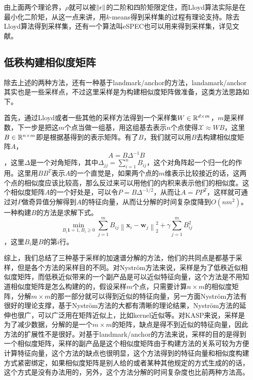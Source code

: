 由上面两个理论界，$\rho$就可以被$\left\lVert\epsilon\right\rVert$的二阶和四阶矩限定住，而Lloyd算法实际是在最小化二阶矩，从这一点来讲，用$k$-means得到采样集的过程有理论支持。除去Lloyd算法得到采样集，还有一个算法叫eSPEC也可以用来得到采样集，详见文献\cite{wang2009approximate}。

\subsection{低秩构建相似度矩阵}
除去上述的两种方法，还有一种基于landmark/anchor的方法，landamark/anchor其实也是一些采样点，不过这里采样是为构建相似度矩阵做准备，这类方法思路如下。

首先，通过Lloyd或者一些其他的采样方法得到一个采样集$W \in \mathbb{R}^{d \times m}$，$m$是采样数，下一步是把这$m$个点当做一组基，用这组基去表示$n$个点使得$\mathcal{X} \approx WB$，这里$B \in \mathbb{R}^{n \times m}$即是根据基得到的表示矩阵。有了$B$，我们就可以用$B$去构建相似度矩阵$A$，$$A = B\Delta^{-1}B$$，这里$\Delta$是一个对角矩阵，其中$\Delta_{jj} = \sum_{i=1}^n B_{ij}$，这个对角阵起一个归一化的作用。这里用$BB^T$表示$A$的一个直觉是，如果两个点的$m$维表示比较接近的话，这两个点的相似度应该比较高，那么反过来可以用他们的内积来表示他们的相似度。这个相似度矩阵$A$的一个好处是，可以令$P = B\Delta^{-1/2}$，从而让$A = PP^T$，这样就可通过对$P$做奇异值分解得到$A$的特征向量，从而让分解的时间复杂度降到$O(nm^2)$。一种构建$B$的方法是求解下式。$$\min _{B_i \mathbf{1}=1, B_i \geq 0} \sum_{j=1}^{m} B_{i j}\left\|\mathbf{x}_{i}-\mathbf{w}_{j}\right\|_{2}^{2}+\gamma \sum_{j=1}^{m} B_{i j}^{2}$$，这里$B_i$是$B$的第$i$行。

综上，我们总结了三种基于采样的加速谱分解的方法，他们的共同点是都基于采样，但是各个方法的采样目的不同。对Nyström方法来说，采样是为了低秩近似相似度矩阵，而低秩近似带来的一个副产品是可以近似特征向量，这个方法是不用知道相似度矩阵是怎么构建的的，假设采样$m$个点，只需要计算$n \times m$的相似度矩阵，分解$m \times m$的那一部分就可以得到近似的特征向量，另一方面Nyström方法有很好的理论支撑，基于Nyström方法的大都有清晰的理论结果，Nyström方法的延伸也很广，可以广泛用在矩阵近似上，比如kernel近似等。对KASP来说，采样是为了减少数据，分解的是一个$m \times m$的矩阵，缺点是得不到近似的特征向量，因此方法的扩展性不是很好。对基于landmark/anchor的方法来说，采样的目的是得到一个相似度矩阵，采样的副产品是这个相似度矩阵由于构建方法的关系可较为方便计算特征向量，这个方法的缺点也很明显，这个方法得到的特征向量和相似度构建方式紧密绑定，如果相似度矩阵是别人给的或者某种其他规定的方式生成的的话，这个方式是没有办法用的，另外，这个方法分解的时间复杂度也比前两种方法高。

